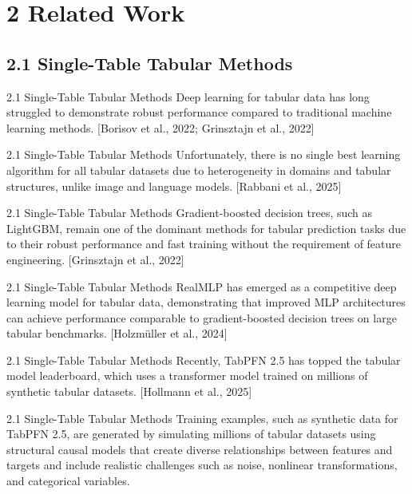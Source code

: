 \documentclass[aspectratio=169,10pt]{beamer}
\newcommand{\cit}[1]{{\scriptsize\color{gray}[#1]}}
\begin{document}
\section{2 Related Work}

\subsection{2.1 Single-Table Tabular Methods}

\begin{frame}{2.1 Single-Table Tabular Methods}
Deep learning for tabular data has long struggled to demonstrate robust performance compared to traditional machine learning methods.
\cit{Borisov et al., 2022; Grinsztajn et al., 2022}
\end{frame}

\begin{frame}{2.1 Single-Table Tabular Methods}
Unfortunately, there is no single best learning algorithm for all tabular datasets due to heterogeneity in domains and tabular structures, unlike image and language models.
\cit{Rabbani et al., 2025}
\end{frame}

\begin{frame}{2.1 Single-Table Tabular Methods}
Gradient-boosted decision trees, such as LightGBM, remain one of the dominant methods for tabular prediction tasks due to their robust performance and fast training without the requirement of feature engineering.
\cit{Grinsztajn et al., 2022}
\end{frame}

\begin{frame}{2.1 Single-Table Tabular Methods}
RealMLP has emerged as a competitive deep learning model for tabular data, demonstrating that improved MLP architectures can achieve performance comparable to gradient-boosted decision trees on large tabular benchmarks.
\cit{Holzm\"uller et al., 2024}
\end{frame}

\begin{frame}{2.1 Single-Table Tabular Methods}
Recently, TabPFN 2.5 has topped the tabular model leaderboard, which uses a transformer model trained on millions of synthetic tabular datasets.
\cit{Hollmann et al., 2025}
\end{frame}

\begin{frame}{2.1 Single-Table Tabular Methods}
Training examples, such as synthetic data for TabPFN 2.5, are generated by simulating millions of tabular datasets using structural causal models that create diverse relationships between features and targets and include realistic challenges such as noise, nonlinear transformations, and categorical variables.
\end{frame}
\end{document}
